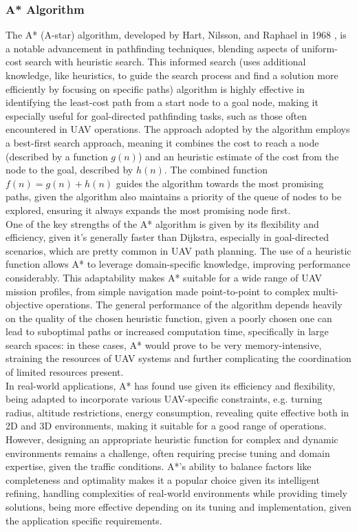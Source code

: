 \documentclass[conference]{IEEEtran}
\begin{document}
\subsubsection{A* Algorithm}

The A* (A-star) algorithm, developed by Hart, Nilsson, and Raphael in 1968 \cite{astar}, is a notable advancement in pathfinding techniques, blending aspects of uniform-cost search with heuristic search. This informed search (uses additional knowledge, like heuristics, to guide the search process and find a solution more efficiently by focusing on specific paths) algorithm is highly effective in identifying the least-cost path from a start node to a goal node, making it especially useful for goal-directed pathfinding tasks, such as those often encountered in UAV operations. The approach adopted by the algorithm employs a best-first search approach, meaning it combines the cost to reach a node (described by a function $g(n)$) and an heuristic estimate of the cost from the node to the goal, described by $h(n)$. The combined function $f(n)=g(n)+h(n)$ guides the algorithm towards the most promising paths, given the algorithm also maintains a priority of the queue of nodes to be explored, ensuring it always expands the most promising node first. \\

One of the key strengths of the A* algorithm is given by its flexibility and efficiency, given it's generally faster than Dijkstra, especially in goal-directed scenarios, which are pretty common in UAV path planning. The use of a heuristic function allows A* to leverage domain-specific knowledge, improving performance considerably. This adaptability makes A* suitable for a wide range of UAV mission profiles, from simple navigation made point-to-point to complex multi-objective operations. The general performance of the algorithm depends heavily on the quality of the chosen heuristic function, given a poorly chosen one can lead to suboptimal paths or increased computation time, specifically in large search spaces: in these cases, A* would prove to be very memory-intensive, straining the resources of UAV systems and further complicating the coordination of limited resources present. \\

In real-world applications, A* has found use given its efficiency and flexibility, being adapted to incorporate various UAV-specific constraints, e.g. turning radius, altitude restrictions, energy consumption, revealing quite effective both in 2D and 3D environments, making it suitable for a good range of operations. However, designing an appropriate heuristic function for complex and dynamic environments remains a challenge, often requiring precise tuning and domain expertise, given the traffic conditions. A*'s ability to balance factors like completeness and optimality makes it a popular choice given its intelligent refining, handling complexities of real-world environments while providing timely solutions, being more effective depending on its tuning and implementation, given the application specific requirements.
\end{document}
